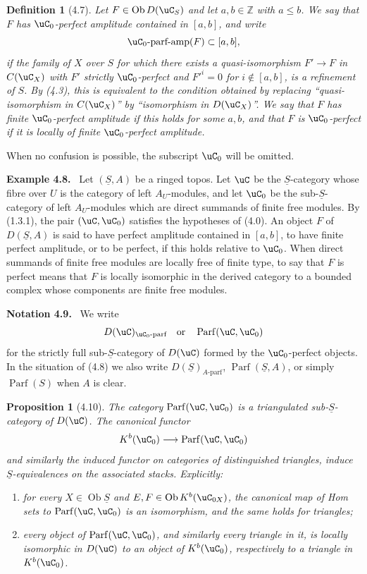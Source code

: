 \documentclass[11pt]{article}
\theoremstyle{plain}
\newtheorem*{proposition*}{Proposition}
\newtheorem*{definition*}{Definition}
\theoremstyle{definition}
\theoremstyle{remark}
\newenvironment{statement}[1]{\par\medskip\noindent\textbf{#1.}\ }{\par\medskip}
\newcommand{\ZZ}{\mathbb Z}
\DeclareMathOperator{\ob}{Ob}
\providecommand{\Parf}{\operatorname{Parf}}
\providecommand{\uS}{\underline{S}}
\begin{document}
\begin{definition*}[4.7]
Let $F\in\ob D(\uC_S)$ and let $a,b\in\ZZ$ with $a\leq b$. We say that $F$ has \emph{$\uC_0$-perfect amplitude contained in $[a,b]$}, and write
\[
\uC_0\text{-parf-amp}(F)\subset[a,b],
\]
if the family of $X$ over $S$ for which there exists a quasi-isomorphism $F'\to F$ in $C(\uC_X)$ with $F'$ strictly $\uC_0$-perfect and $F'^i=0$ for $i\notin[a,b]$, is a refinement of $S$. By (4.3), this is equivalent to the condition obtained by replacing ``quasi-isomorphism in $C(\uC_X)$'' by ``isomorphism in $D(\uC_X)$''. We say that $F$ has finite $\uC_0$-perfect amplitude if this holds for some $a,b$, and that $F$ is $\uC_0$-perfect if it is locally of finite $\uC_0$-perfect amplitude.
\end{definition*}

When no confusion is possible, the subscript $\uC_0$ will be omitted.

\begin{statement}{Example 4.8}
Let $(\uS,A)$ be a ringed topos. Let $\uC$ be the $\uS$-category whose fibre over $U$ is the category of left $A_U$-modules, and let $\uC_0$ be the sub-$\uS$-category of left $A_U$-modules which are direct summands of finite free modules. By (1.3.1), the pair $(\uC,\uC_0)$ satisfies the hypotheses of (4.0). An object $F$ of $D(\uS,A)$ is said to have perfect amplitude contained in $[a,b]$, to have finite perfect amplitude, or to be perfect, if this holds relative to $\uC_0$. When direct summands of finite free modules are locally free of finite type, to say that $F$ is perfect means that $F$ is locally isomorphic in the derived category to a bounded complex whose components are finite free modules.
\end{statement}

\begin{statement}{Notation 4.9}
We write
\[
D(\uC)_{\uC_0\text{-parf}}\quad\text{or}\quad \Parf(\uC,\uC_0)
\]
for the strictly full sub-$\uS$-category of $D(\uC)$ formed by the $\uC_0$-perfect objects. In the situation of (4.8) we also write $D(\uS)_{A\text{-parf}}$, $\Parf(\uS,A)$, or simply $\Parf(S)$ when $A$ is clear.
\end{statement}

\begin{proposition*}[4.10]
The category $\Parf(\uC,\uC_0)$ is a triangulated sub-$\uS$-category of $D(\uC)$. The canonical functor
\[
K^b(\uC_0)\longrightarrow\Parf(\uC,\uC_0)
\]
and similarly the induced functor on categories of distinguished triangles, induce $\uS$-equivalences on the associated stacks. Explicitly:
\begin{enumerate}[label=(\roman*)]
\item for every $X\in\ob\uS$ and $E,F\in\ob K^b(\uC_{0X})$, the canonical map of Hom sets to $\Parf(\uC,\uC_0)$ is an isomorphism, and the same holds for triangles;
\item every object of $\Parf(\uC,\uC_0)$, and similarly every triangle in it, is locally isomorphic in $D(\uC)$ to an object of $K^b(\uC_0)$, respectively to a triangle in $K^b(\uC_0)$.
\end{enumerate}
\end{proposition*}
\end{document}
